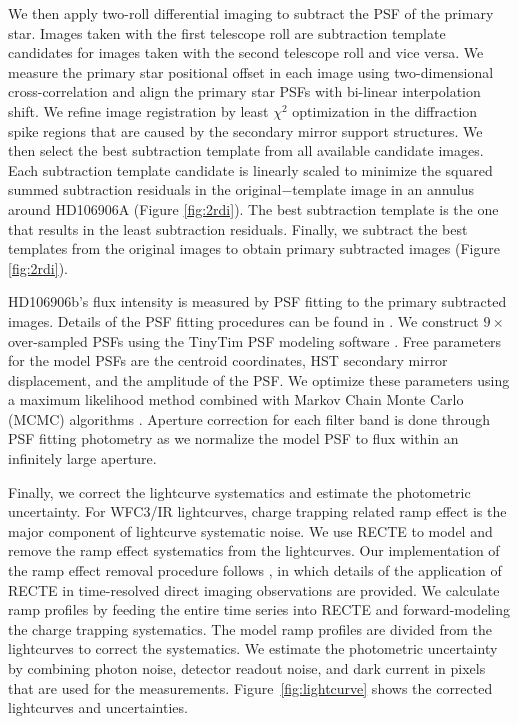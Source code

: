 \documentclass[twocolumn, trackchanges]{aastex62}
\begin{document}
We then apply two-roll differential imaging \citep[2RDI, e.g.,][]{Lowrance1999,Song2006} to subtract the PSF of the primary star.  Images taken with the first telescope roll are subtraction template candidates for images taken with the second telescope roll and vice versa. We measure the primary star positional offset in each image using two-dimensional cross-correlation and align the primary star PSFs with bi-linear interpolation shift. We refine image registration by least $\chi^{2}$ optimization in the diffraction spike regions that are caused by the secondary mirror support structures. We then select the best subtraction template from all available candidate images.  Each subtraction template candidate is linearly scaled to minimize the squared summed subtraction residuals in the original$-$template image in an annulus around HD106906A (Figure \ref{fig:2rdi}). The best subtraction template is the one that results in the least subtraction residuals. Finally, we subtract the best templates from the original images to obtain primary subtracted images (Figure \ref{fig:2rdi}). 

HD106906b's flux intensity is measured by PSF fitting to the primary subtracted images. Details of the PSF fitting procedures can be found in \citet{Zhou2019}. We construct $9\times$ over-sampled PSFs using the TinyTim PSF modeling software \citep{Krist1995}. Free parameters for the model PSFs are the centroid coordinates, HST secondary mirror displacement, and the amplitude of the PSF. We optimize these parameters using a maximum likelihood method combined with Markov Chain Monte Carlo (MCMC) algorithms \citep[MCMC performed by \texttt{emcee},][]{Foreman-Mackey2012}. Aperture correction for each filter band is done through PSF fitting photometry as we normalize the model PSF to flux within an infinitely large aperture. 

Finally, we correct the lightcurve systematics and estimate the photometric uncertainty.  For WFC3/IR lightcurves, charge trapping related ramp effect is the major component of lightcurve systematic noise. We use RECTE \citep{Zhou2017} to model and remove the ramp effect systematics from the lightcurves. Our implementation of the ramp effect removal procedure follows \citet{Zhou2019}, in which details of the application of RECTE in time-resolved direct imaging observations are provided. We calculate ramp profiles by feeding the entire time series into RECTE and forward-modeling the charge trapping systematics. The model ramp profiles are divided from the lightcurves to correct the systematics.  We estimate the photometric uncertainty by combining  photon noise, detector readout noise, and dark current in pixels that are used for the measurements. Figure~\ref{fig:lightcurve} shows the corrected lightcurves and uncertainties.
\end{document}
